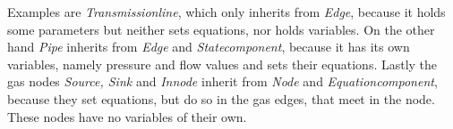 \documentclass[a4paper]{article}
\begin{document}
Examples are \emph{Transmissionline}, which only inherits from \emph{Edge}, because it holds some parameters but neither sets equations, nor holds variables.
On the other hand \emph{Pipe} inherits from \emph{Edge} and \emph{Statecomponent}, because it has its own variables, namely pressure and flow values and sets their equations.
Lastly the gas nodes \emph{Source, Sink} and \emph{Innode} inherit from \emph{Node} and \emph{Equationcomponent}, because they set equations, but do so in the gas edges, that meet in the node. These nodes have no variables of their own.
\end{document}
